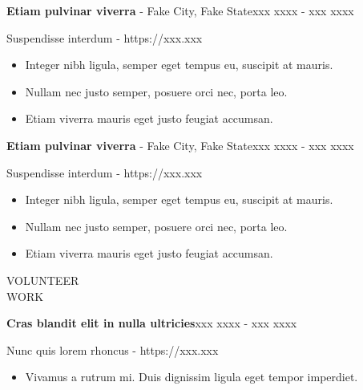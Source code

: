 \documentclass{article}
\newcommand{\itemSectionSpace}{\vspace{0.2in}}
\newcommand{\sectionSpace}{\vspace{0.3in}}
\begin{document}
\itemSectionSpace

\begin{minipage}[t]{0.125\linewidth}
\uppercase{}
\end{minipage}%
\hfill
\begin{minipage}[t]{0.85\linewidth}
\textbf{Etiam pulvinar viverra} - Fake City, Fake State\hfill xxx xxxx - xxx xxxx

Suspendisse interdum - https://xxx.xxx

\begin{itemize}[noitemsep,topsep=0pt]
   \item Integer nibh ligula, semper eget tempus eu, suscipit at mauris.
   \item Nullam nec justo semper, posuere orci nec, porta leo.
   \item Etiam viverra mauris eget justo feugiat accumsan.
 \end{itemize}
\end{minipage}

\itemSectionSpace

\begin{minipage}[t]{0.125\linewidth}
\uppercase{}
\end{minipage}%
\hfill
\begin{minipage}[t]{0.85\linewidth}
\textbf{Etiam pulvinar viverra} - Fake City, Fake State\hfill xxx xxxx - xxx xxxx

Suspendisse interdum - https://xxx.xxx

\begin{itemize}[noitemsep,topsep=0pt]
   \item Integer nibh ligula, semper eget tempus eu, suscipit at mauris.
   \item Nullam nec justo semper, posuere orci nec, porta leo.
   \item Etiam viverra mauris eget justo feugiat accumsan.
 \end{itemize}
\end{minipage}

\sectionSpace

\begin{minipage}[t]{0.125\linewidth}
\uppercase{Volunteer\\Work}
\end{minipage}%
\hfill
\begin{minipage}[t]{0.85\linewidth}
\textbf{Cras blandit elit in nulla ultricies}\hfill xxx xxxx - xxx xxxx

 Nunc quis lorem rhoncus - https://xxx.xxx

\begin{itemize}[noitemsep,topsep=0pt]
   \item Vivamus a rutrum mi. Duis dignissim ligula eget tempor imperdiet.
 \end{itemize}
\end{minipage}
\end{document}
